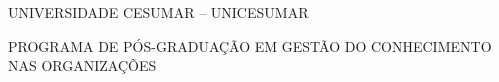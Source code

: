 
\begin{center}
    {\ABNTEXchapterfont\Large UNIVERSIDADE CESUMAR – UNICESUMAR}
    \par
    {\ABNTEXchapterfont\Large PROGRAMA DE PÓS-GRADUAÇÃO EM GESTÃO DO CONHECIMENTO NAS ORGANIZAÇÕES}
\end{center}

\vspace*{85mm}

\begin{center}
    {\ABNTEXchapterfont\Huge \imprimirtitulo}\\[5mm]
    {\ABNTEXchapterfont\huge \imprimirsubtitulo}
    \vskip 25mm
    {\ABNTEXchapterfont\bfseries\Large\textbf\imprimirautor} 
    \vskip 65mm
    {\ABNTEXchapterfont\Large \imprimircidade}
    \par
    {\ABNTEXchapterfont\Large \imprimirano}
\end{center}